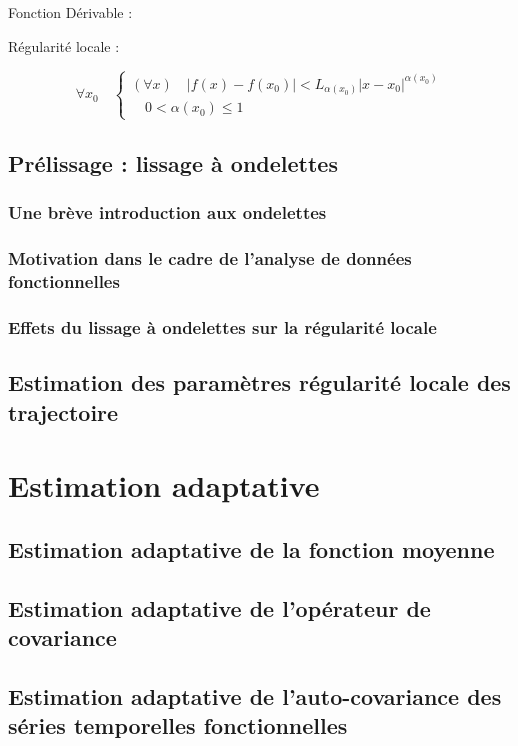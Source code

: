 Fonction Dérivable :
$$$$


Régularité locale :


$$
\forall x_0 \quad \begin{cases}
(\forall x) \quad |f(x) - f(x_0)| < L_{\alpha(x_0)} |x-x_0|^{\alpha(x_0)}
\\
\quad 0 < {\alpha(x_0)} \leq 1 
\end{cases}
$$

\subsection{Prélissage : lissage à ondelettes}

\subsubsection{Une brève introduction aux ondelettes}

\subsubsection{Motivation dans le cadre de l'analyse de données fonctionnelles}

\subsubsection{Effets du lissage à ondelettes sur la régularité locale}

\subsection{Estimation des paramètres régularité locale des trajectoire}

\section{Estimation adaptative}

\subsection{Estimation adaptative de la fonction moyenne}

\subsection{Estimation adaptative de l'opérateur de covariance}

\subsection{Estimation adaptative de l'auto-covariance des séries temporelles fonctionnelles}